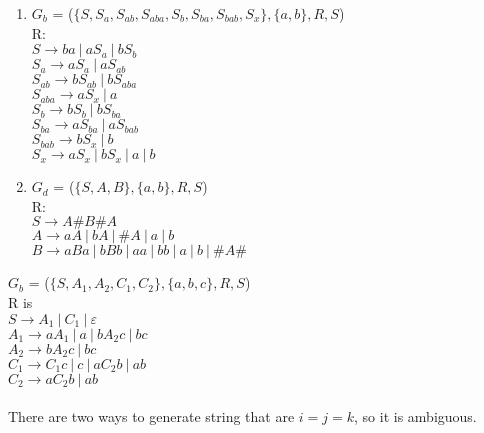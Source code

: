 \documentclass[12pt]{article}
\newenvironment{problem}[2][Problem]{\begin{trivlist}
\item[\hskip \labelsep {\bfseries #1}\hskip \labelsep {\bfseries #2.}]}{\end{trivlist}}
\begin{document}
\begin{problem}{2.6}
\end{problem}
\begin{enumerate}
	\item[(b)]
		$G_b$ = ($\{S, S_a, S_{ab}, S_{aba}, S_b, S_{ba}, S_{bab}, S_x\}, \{a,b\}, R, S$)	\\
		R: 	\\
			$S \to ba \: | \: aS_a \: | \: bS_b$ 	\\
			$S_a \to aS_a \: | \: aS_{ab}$ 	\\
			$S_{ab} \to bS_{ab} \: | \: bS_{aba}$ 	\\
			$S_{aba} \to aS_{x} \: | \: a$ 	\\
			$S_b \to bS_b \: | \: bS_{ba}$ 	\\
			$S_{ba} \to aS_{ba} \: | \: aS_{bab}$ 	\\
			$S_{bab} \to bS_{x} \: | \: b$ 	\\
			$S_x \to aS_x \: | \: bS_x \: | \: a \: | \: b$ 

	\item[(d)]
		$G_d$ = ($\{S,A,B\}, \{a,b\}, R, S$)	\\
		R: 	\\
			$S \to A\#B\#A$ 	\\
			$A \to aA \: | \: bA \: | \: \#A \: | \: a \: | \: b$ 	\\
			$B \to aBa \: | \: bBb \: | \: aa \: | \: bb \: | \: a \: | \: b  \: | \: \#A\#$ 	

\end{enumerate}

\begin{problem}{2.9}
\end{problem}		
	$G_b$ = ($\{S,A_1,A_2,C_1,C_2\}, \{a,b,c\}, R, S$)	\\
	R is 	\\
		$S \to A_1 \: | \: C_1 \: | \: \varepsilon$	\\
		$A_1 \to aA_1 \: | \: a \: | \: bA_2c \: | \: bc$	\\
		$A_2 \to bA_2c \: | \: bc$	\\
		$C_1 \to C_1c \: | \: c \: | \: aC_2b \: | \: ab$	\\
		$C_2 \to aC_2b \: | \: ab$ 	\\ \\
	There are two ways to generate string that are $i=j=k$, so it is ambiguous. 
\end{document}
